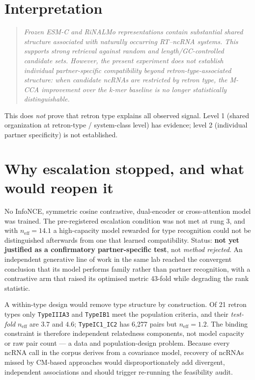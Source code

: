 \documentclass[11pt,a4paper]{article}
\begin{document}
\section{Interpretation}
\begin{quote}\itshape Frozen ESM-C and RiNALMo representations contain substantial shared
structure associated with naturally occurring RT--ncRNA systems. This supports strong retrieval
against random and length/GC-controlled candidate sets. However, the present experiment does not
establish individual partner-specific compatibility beyond retron-type-associated structure: when
candidate ncRNAs are restricted by retron type, the M-CCA improvement over the k-mer baseline is
no longer statistically distinguishable.\end{quote}

This does \emph{not} prove that retron type explains all observed signal. Level 1 (shared
organization at retron-type / system-class level) has evidence; level 2 (individual partner
specificity) is not established.

\section{Why escalation stopped, and what would reopen it}
No InfoNCE, symmetric cosine contrastive, dual-encoder or cross-attention model was trained. The
pre-registered escalation condition was not met at rung 3, and with $n_{\mathrm{eff}}=14.1$ a
high-capacity model rewarded for type recognition could not be distinguished afterwards from one
that learned compatibility. Status: \textbf{not yet justified as a confirmatory partner-specific
test}, not \emph{method rejected}. An independent generative line of work in the same lab reached
the convergent conclusion that its model performs family rather than partner recognition, with a
contrastive arm that raised its optimised metric 43-fold while degrading the rank statistic.

A within-type design would remove type structure by construction. Of 21 retron types only
\texttt{TypeIIIA3} and \texttt{TypeIB1} meet the population criteria, and their \emph{test-fold}
$n_{\mathrm{eff}}$ are $3.7$ and $4.6$; \texttt{TypeIC1\_IC2} has 6{,}277 pairs but
$n_{\mathrm{eff}}=1.2$. The binding constraint is therefore independent relatedness components,
not model capacity or raw pair count --- a data and population-design problem. Because every
ncRNA call in the corpus derives from a covariance model, recovery of ncRNAs missed by CM-based
approaches would disproportionately add divergent, independent associations and should trigger
re-running the feasibility audit.
\end{document}
